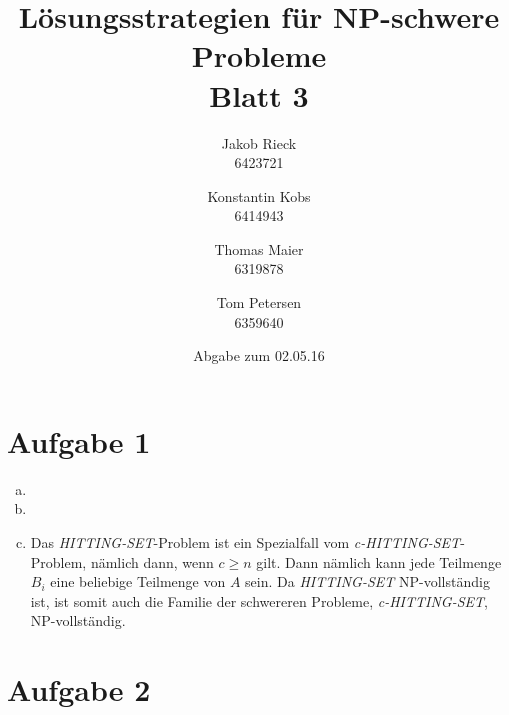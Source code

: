 \documentclass[12pt,a4paper]{article}
\title{Lösungsstrategien für NP-schwere Probleme\\Blatt 3}
\author{
		Jakob Rieck\\
		\small{6423721}
	\and
		Konstantin Kobs\\
		\small{6414943}
	\and
		Thomas Maier\\
		\small{6319878}
	\and
		Tom Petersen\\
		\small{6359640}
}
\date{Abgabe zum 02.05.16}
\begin{document}
\maketitle

\section*{Aufgabe 1}

 \begin{enumerate}[a)]

 	\item 

	\item

	\item Das \textit{HITTING-SET}-Problem ist ein Spezialfall vom \textit{c-HITTING-SET}-Problem, nämlich dann, wenn $c \geq n$ gilt. Dann nämlich kann jede Teilmenge $B_i$ eine beliebige Teilmenge von $A$ sein. Da \textit{HITTING-SET} NP-vollständig ist, ist somit auch die Familie der schwereren Probleme, \textit{c-HITTING-SET}, NP-vollständig. 

\end{enumerate}

\section*{Aufgabe 2}
\end{document}
